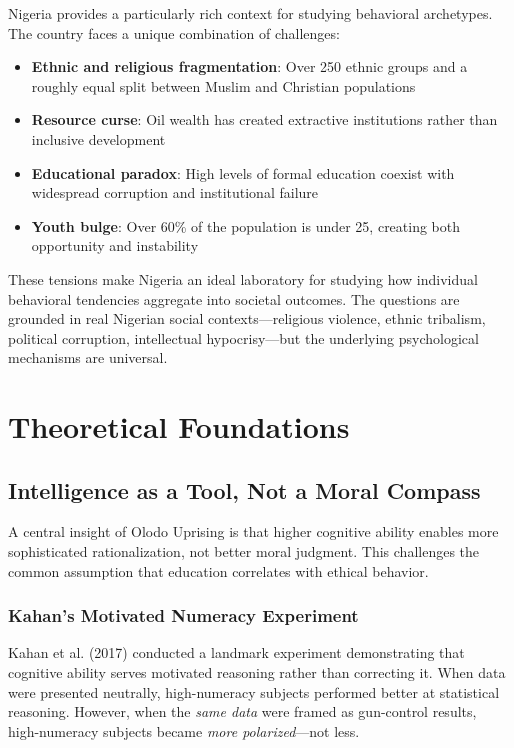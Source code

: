 \documentclass[11pt,a4paper]{article}
\begin{document}
Nigeria provides a particularly rich context for studying behavioral archetypes. The country faces a unique combination of challenges:
\begin{itemize}[leftmargin=*]
    \item \textbf{Ethnic and religious fragmentation}: Over 250 ethnic groups and a roughly equal split between Muslim and Christian populations
    \item \textbf{Resource curse}: Oil wealth has created extractive institutions rather than inclusive development
    \item \textbf{Educational paradox}: High levels of formal education coexist with widespread corruption and institutional failure
    \item \textbf{Youth bulge}: Over 60\% of the population is under 25, creating both opportunity and instability
\end{itemize}

These tensions make Nigeria an ideal laboratory for studying how individual behavioral tendencies aggregate into societal outcomes. The questions are grounded in real Nigerian social contexts—religious violence, ethnic tribalism, political corruption, intellectual hypocrisy—but the underlying psychological mechanisms are universal.

\section{Theoretical Foundations}

\subsection{Intelligence as a Tool, Not a Moral Compass}

A central insight of Olodo Uprising is that higher cognitive ability enables more sophisticated rationalization, not better moral judgment. This challenges the common assumption that education correlates with ethical behavior.

\subsubsection{Kahan's Motivated Numeracy Experiment}

Kahan et al. (2017) conducted a landmark experiment demonstrating that cognitive ability serves motivated reasoning rather than correcting it. When data were presented neutrally, high-numeracy subjects performed better at statistical reasoning. However, when the \textit{same data} were framed as gun-control results, high-numeracy subjects became \textit{more polarized}—not less.
\end{document}
